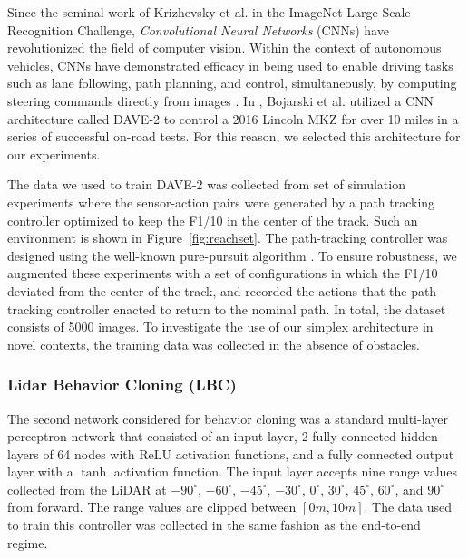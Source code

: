 \documentclass[manuscript,screen,review]{acmart}
\begin{document}
Since the seminal work of Krizhevsky et al. \cite{AlexNet2012} in the ImageNet Large Scale Recognition Challenge, \emph{Convolutional Neural Networks} (CNNs) have revolutionized the field of computer vision. Within the context of autonomous vehicles, CNNs have demonstrated efficacy in being used to enable driving tasks such as lane following, path planning, and control, simultaneously, by computing steering commands directly from images \cite{DeepDrive2015}. In \cite{bojarski2016end}, Bojarski et al. utilized a CNN architecture called DAVE-2 to control a 2016 Lincoln MKZ for over 10 miles in a series of successful on-road tests. For this reason, we selected this architecture for our experiments. 

The data we used to train DAVE-2 was collected from set of simulation experiments where the sensor-action pairs were generated by a path tracking controller optimized to keep the F1/10 in the center of the track. Such an environment is shown in Figure~\ref{fig:reachset}. The path-tracking controller was designed using the well-known pure-pursuit algorithm \cite{coulter1992implementation}. To ensure robustness, we augmented these experiments with a set of configurations in which the F1/10 deviated from the center of the track, and recorded the actions that the path tracking controller enacted to return to the nominal path. In total, the dataset consists of 5000 images.  To investigate the use of our simplex architecture in novel contexts, the training data was collected in the absence of obstacles.
 



\subsubsection{Lidar Behavior Cloning (LBC)}
\label{sec:lidar cloning}
The second network considered for behavior cloning was a standard multi-layer perceptron network that consisted of an input layer, 2 fully connected hidden layers of 64 nodes with ReLU activation functions, and a fully connected output layer with a $\tanh$ activation function. The input layer accepts nine range values collected from the LiDAR at $-90^{\circ}$, $-60^{\circ}$, $-45^{\circ}$, $-30^{\circ}$, $0^{\circ}$, $30^{\circ}$, $45^{\circ}$, $60^{\circ}$, and $90^{\circ}$ from forward. The range values are clipped between $[0m, 10m]$. The data used to train this controller was collected in the same fashion as the end-to-end regime. 
\end{document}
